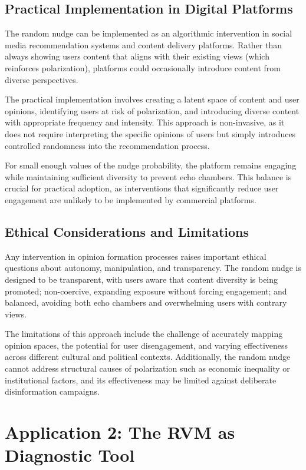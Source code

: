 \subsection{Practical Implementation in Digital Platforms}

The random nudge can be implemented as an algorithmic intervention in social media recommendation systems and content delivery platforms. Rather than always showing users content that aligns with their existing views (which reinforces polarization), platforms could occasionally introduce content from diverse perspectives.

The practical implementation involves creating a latent space of content and user opinions, identifying users at risk of polarization, and introducing diverse content with appropriate frequency and intensity. This approach is non-invasive, as it does not require interpreting the specific opinions of users but simply introduces controlled randomness into the recommendation process.

For small enough values of the nudge probability, the platform remains engaging while maintaining sufficient diversity to prevent echo chambers. This balance is crucial for practical adoption, as interventions that significantly reduce user engagement are unlikely to be implemented by commercial platforms.

\subsection{Ethical Considerations and Limitations}

Any intervention in opinion formation processes raises important ethical questions about autonomy, manipulation, and transparency. The random nudge is designed to be transparent, with users aware that content diversity is being promoted; non-coercive, expanding exposure without forcing engagement; and balanced, avoiding both echo chambers and overwhelming users with contrary views.

The limitations of this approach include the challenge of accurately mapping opinion spaces, the potential for user disengagement, and varying effectiveness across different cultural and political contexts. Additionally, the random nudge cannot address structural causes of polarization such as economic inequality or institutional factors, and its effectiveness may be limited against deliberate disinformation campaigns.

\section{Application 2: The RVM as Diagnostic Tool}

